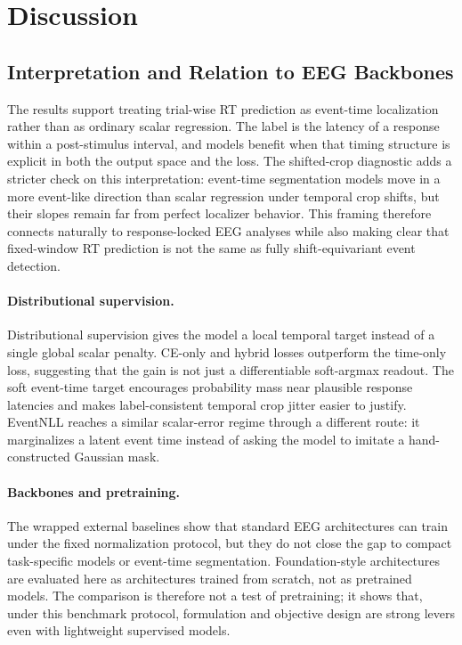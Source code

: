 \documentclass[12pt]{article}
\begin{document}
\section{Discussion}

\subsection{Interpretation and Relation to EEG Backbones}

The results support treating trial-wise RT prediction as event-time localization rather than as ordinary scalar regression. The label is the latency of a response within a post-stimulus interval, and models benefit when that timing structure is explicit in both the output space and the loss. The shifted-crop diagnostic adds a stricter check on this interpretation: event-time segmentation models move in a more event-like direction than scalar regression under temporal crop shifts, but their slopes remain far from perfect localizer behavior. This framing therefore connects naturally to response-locked EEG analyses while also making clear that fixed-window RT prediction is not the same as fully shift-equivariant event detection.

\paragraph{Distributional supervision.}

Distributional supervision gives the model a local temporal target instead of a single global scalar penalty. CE-only and hybrid losses outperform the time-only loss, suggesting that the gain is not just a differentiable soft-argmax readout. The soft event-time target encourages probability mass near plausible response latencies and makes label-consistent temporal crop jitter easier to justify. EventNLL reaches a similar scalar-error regime through a different route: it marginalizes a latent event time instead of asking the model to imitate a hand-constructed Gaussian mask.

\paragraph{Backbones and pretraining.}

The wrapped external baselines show that standard EEG architectures can train under the fixed normalization protocol, but they do not close the gap to compact task-specific models or event-time segmentation. Foundation-style architectures are evaluated here as architectures trained from scratch, not as pretrained models. The comparison is therefore not a test of pretraining; it shows that, under this benchmark protocol, formulation and objective design are strong levers even with lightweight supervised models.
\end{document}
